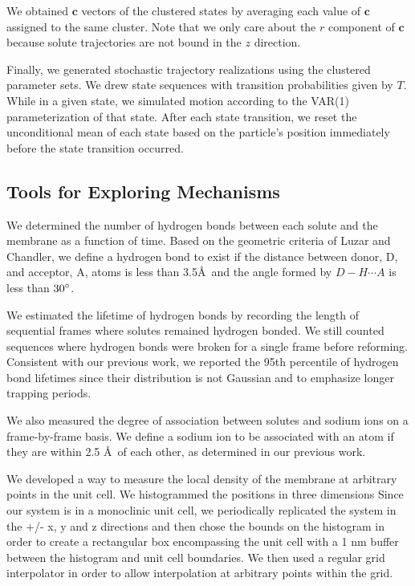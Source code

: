 \documentclass{article}
\begin{document}
  We obtained $\mathbf{c}$ vectors of the clustered states by averaging 
  each value of $\mathbf{c}$ assigned to the same cluster. Note that we only care
  about the $r$ component of $\mathbf{c}$ because solute trajectories are not 
  bound in the $z$ direction.
  
  Finally, we generated stochastic trajectory realizations using the clustered
  parameter sets. We drew state sequences with transition probabilities given by
  $T$. While in a given state, we simulated motion according to the VAR(1)
  parameterization of that state. After each state transition, we reset the 
  unconditional mean of each state based on the particle's position immediately
  before the state transition occurred.
  
  \subsection{Tools for Exploring Mechanisms}\label{method:interactions}
  
  We determined the number of hydrogen bonds between each solute and the membrane
  as a function of time. Based on the geometric criteria of Luzar and Chandler, we 
  define a hydrogen bond to exist if the distance between donor, D, and acceptor, 
  A, atoms is less than 3.5\AA~and the angle formed by $D-H \cdots A$ is less than 
  $30\degree$.~\cite{luzar_effect_1996}
  
  We estimated the lifetime of hydrogen bonds by recording the length of 
  sequential frames where solutes remained hydrogen bonded. We still counted sequences
  where hydrogen bonds were broken for a single frame before reforming. Consistent
  with our previous work, we reported the 95th percentile of hydrogen bond lifetimes
  since their distribution is not Gaussian and to emphasize longer trapping periods. 
  
  We also measured the degree of association between solutes and sodium ions on a
  frame-by-frame basis. We define a sodium ion to be associated with an atom if they
  are within 2.5 \AA~of each other, as determined in our previous work.~\cite{coscia_chemically_2019}
  
  We developed a way to measure the local density of the membrane at arbitrary
  points in the unit cell. We histogrammed the positions in three dimensions
  Since our system is in a monoclinic unit cell, we periodically replicated
  the system in the +/- x, y and z directions and then chose the bounds on the
  histogram in order to create a rectangular box encompassing the unit cell with
  a 1 nm buffer between the histogram and unit cell boundaries. We then used a regular
  grid interpolator in order to allow interpolation at arbitrary points within the grid.
  
\end{document}
